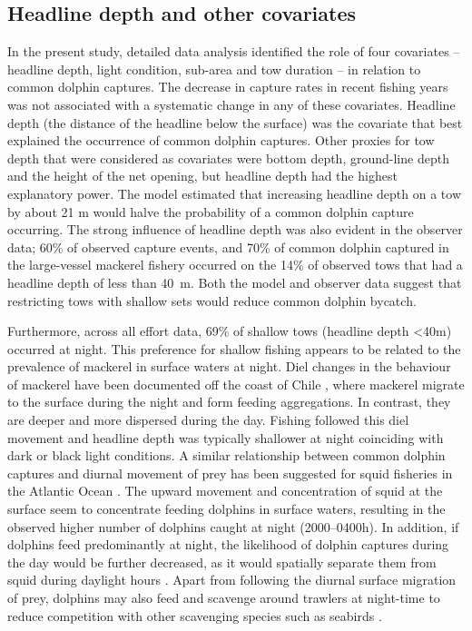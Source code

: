 \documentclass[10pt]{article}
\begin{document}
\subsection*{Headline depth and other covariates}
In the present study, detailed data analysis identified the role of
four covariates -- headline depth, light condition, sub-area and tow
duration -- in relation to common dolphin captures.  The decrease in
capture rates in recent fishing years was not associated with a
systematic change in any of these covariates.  Headline depth (the
distance of the headline below the surface) was the covariate that
best explained the occurrence of common dolphin captures. Other
proxies for tow depth that were considered as covariates were bottom depth, ground-line depth and the height of the net opening, but headline depth had the highest explanatory power. The model estimated that increasing headline depth on a tow by about 21 m would halve the probability of a common dolphin capture occurring. The strong influence of headline depth was also evident in the observer data; 
  60\% of observed capture events, and 70\% of common dolphin captured
  in the large-vessel mackerel fishery occurred on the 14\% of
  observed tows that had a headline depth of less than 40~m.  Both the
  model and observer data suggest that restricting tows with shallow sets would reduce common dolphin bycatch. 

Furthermore, across all effort data, 69\% of shallow tows (headline depth \textless 40m) occurred at night.  This preference for shallow fishing appears to be related to the prevalence of mackerel in surface waters at night. Diel changes in the behaviour of mackerel have been documented off the coast of Chile \cite{bertrand_diel_2004}, where mackerel migrate to the surface during the night and form feeding aggregations.  In contrast, they are deeper and more dispersed during the day.  Fishing followed this diel movement and headline depth was typically shallower at night 
coinciding with dark or black light conditions. A similar relationship between common dolphin captures and diurnal movement of prey has been suggested for squid fisheries in the Atlantic Ocean \cite{waring_incidental_1990}.  The upward movement and concentration of squid at the surface seem to concentrate feeding dolphins in surface waters, resulting in the observed higher number of dolphins caught at night (2000--0400h).  In addition, if dolphins feed predominantly at night, the likelihood of dolphin captures during the day would be further decreased, as it would spatially separate them from squid during daylight hours \cite{waring_incidental_1990}.  Apart from following the diurnal surface migration of prey, dolphins may also feed and scavenge around trawlers at night-time to reduce competition with other scavenging species such as seabirds \cite{morizur_incidental_1999}.
\end{document}
